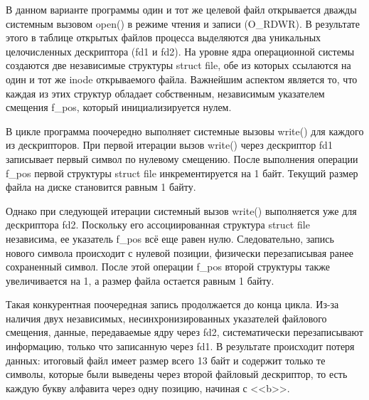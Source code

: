 


В данном варианте программы один и тот же целевой файл открывается дважды системным 
вызовом open() в режиме чтения и записи (O\_RDWR). В результате этого в таблице открытых 
файлов процесса выделяются два уникальных целочисленных дескриптора (fd1 и fd2). 
На уровне ядра операционной системы создаются две независимые структуры struct file, 
обе из которых ссылаются на один и тот же inode открываемого файла. Важнейшим аспектом 
является то, что каждая из этих структур обладает собственным, независимым указателем 
смещения f\_pos, который инициализируется нулем.

В цикле программа поочередно выполняет системные вызовы write() для каждого из дескрипторов. 
При первой итерации вызов write() через дескриптор fd1 записывает первый символ по нулевому 
смещению. После выполнения операции f\_pos первой структуры struct file инкрементируется на 
1 байт. Текущий размер файла на диске становится равным 1 байту.

Однако при следующей итерации системный вызов write() выполняется уже для дескриптора fd2. 
Поскольку его ассоциированная структура struct file независима, ее указатель f\_pos 
всё еще равен нулю. Следовательно, запись нового символа происходит с нулевой позиции, 
физически перезаписывая ранее сохраненный символ. После этой операции f\_pos 
второй структуры также увеличивается на 1, а размер файла остается равным 1 байту.

Такая конкурентная поочередная запись продолжается до конца цикла. Из-за наличия 
двух независимых, несинхронизированных указателей файлового смещения, данные, 
передаваемые ядру через fd2, систематически перезаписывают информацию, только что 
записанную через fd1. В результате происходит потеря данных: итоговый файл имеет 
размер всего 13 байт и содержит только те символы, которые были выведены через второй 
файловый дескриптор, то есть каждую букву алфавита через одну позицию, начиная с <<b>>.

